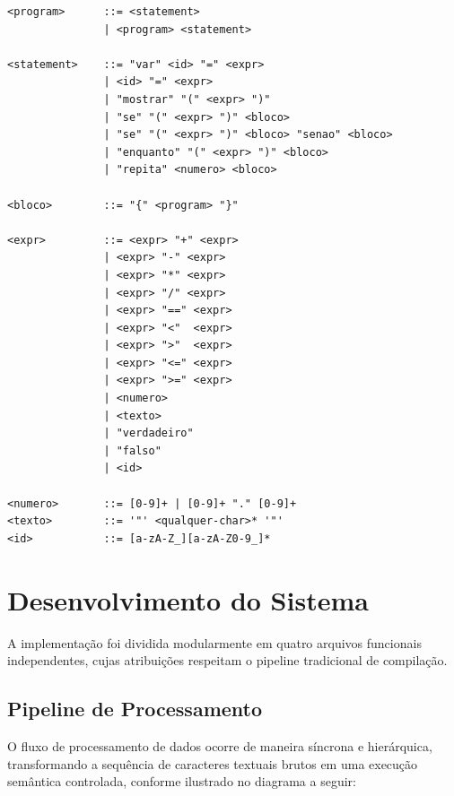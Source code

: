 \documentclass[12pt,a4paper]{article}
\begin{document}
\begin{lstlisting}[language={}, caption={Especificação BNF da Linguagem LudiCode}, keywordstyle=\color{black}, numbers=none, frame=single]
<program>      ::= <statement>
               | <program> <statement>

<statement>    ::= "var" <id> "=" <expr>
               | <id> "=" <expr>
               | "mostrar" "(" <expr> ")"
               | "se" "(" <expr> ")" <bloco>
               | "se" "(" <expr> ")" <bloco> "senao" <bloco>
               | "enquanto" "(" <expr> ")" <bloco>
               | "repita" <numero> <bloco>

<bloco>        ::= "{" <program> "}"

<expr>         ::= <expr> "+" <expr>
               | <expr> "-" <expr>
               | <expr> "*" <expr>
               | <expr> "/" <expr>
               | <expr> "==" <expr>
               | <expr> "<"  <expr>
               | <expr> ">"  <expr>
               | <expr> "<=" <expr>
               | <expr> ">=" <expr>
               | <numero>
               | <texto>
               | "verdadeiro"
               | "falso"
               | <id>

<numero>       ::= [0-9]+ | [0-9]+ "." [0-9]+
<texto>        ::= '"' <qualquer-char>* '"'
<id>           ::= [a-zA-Z_][a-zA-Z0-9_]*
\end{lstlisting}

\section{Desenvolvimento do Sistema}

A implementação foi dividida modularmente em quatro arquivos funcionais independentes, cujas atribuições respeitam o pipeline tradicional de compilação.

\subsection{Pipeline de Processamento}

O fluxo de processamento de dados ocorre de maneira síncrona e hierárquica, transformando a sequência de caracteres textuais brutos em uma execução semântica controlada, conforme ilustrado no diagrama a seguir:
\end{document}
